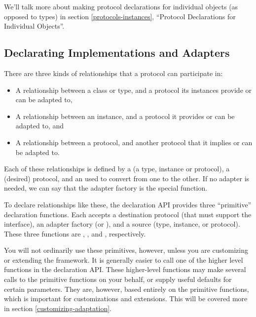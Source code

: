 \begin{verbatim%
}
\begin{verbatim%
}
\begin{verbatim%
}
\begin{verbatim%
}
\begin{description}
We'll talk more about making protocol declarations for individual objects
(as opposed to types) in section \ref{protocols-instances}, ``Protocol
Declarations for Individual Objects''.

\end{description}











\subsection{Declarating Implementations and Adapters}
There are three kinds of relationships that a protocol can participate in:

\begin{itemize}
\item A relationship between a class or type, and a protocol its instances
provide or can be adapted to,

\item A relationship between an instance, and a protocol it provides or can
be adapted to, and

\item A relationship between a protocol, and another protocol that it implies
or can be adapted to.
\end{itemize}

Each of these relationships is defined by a  (a type,
instance or protocol), a  (desired) protocol, and an
 used to convert from one to the other.  If no adapter
is needed, we can say that the adapter factory is the special
 function.

To declare relationships like these, the  declaration API
provides three ``primitive'' declaration functions.  Each accepts a destination
protocol (that must support the  interface),
an adapter factory (or ), and a source (type,
instance, or protocol).  These three functions are
, , and
, respectively.

You will not ordinarily use these primitives, however, unless you are
customizing or extending the framework.  It is generally easier to call one
of the higher level functions in the declaration API.  These higher-level
functions may make several calls to the primitive functions on your behalf, or
supply useful defaults for certain parameters.  They are, however, based
entirely on the primitive functions, which is important for customizations and
extensions.  This will be covered more in section \ref{customizing-adaptation}.


\end{verbatim%
}
\end{verbatim%
}
\end{verbatim%
}
\end{verbatim%
}

